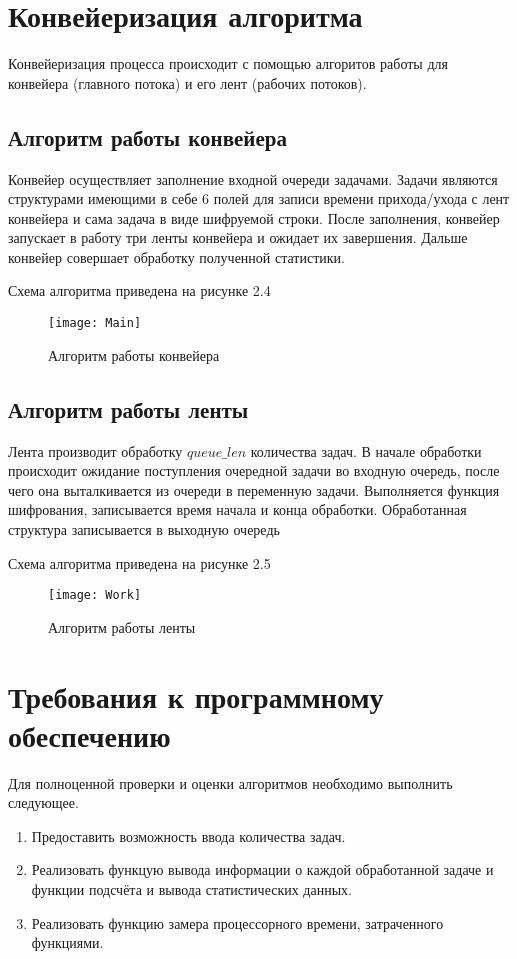 \section{Конвейеризация алгоритма}
Конвейеризация процесса происходит с помощью алгоритов работы для конвейера (главного потока) и его лент (рабочих потоков).

	\subsection{Алгоритм работы конвейера}
	Конвейер осуществляет заполнение входной очереди задачами. Задачи являются структурами имеющими в себе 6 полей для записи времени прихода/ухода с лент конвейера и сама задача в виде шифруемой строки. После заполнения, конвейер запускает в работу три ленты конвейера и ожидает их завершения. Дальше конвейер совершает обработку полученной статистики.
	
	Схема алгоритма приведена на рисунке 2.4
	\begin{figure}[h]
		\begin{center}
			{\texttt{[image: Main]}}
			\caption{Алгоритм работы конвейера}
		\end{center}
	\end{figure}

	\subsection{Алгоритм работы ленты}
	Лента производит обработку $queue\_len$ количества задач. В начале обработки происходит ожидание поступления очередной задачи во входную очередь, после чего она выталкивается из очереди в переменную задачи. Выполняется функция шифрования, записывается время начала и конца обработки. Обработанная структура записывается в выходную очередь
	
	Схема алгоритма приведена на рисунке 2.5
	\begin{figure}[h]
		\begin{center}
			{\texttt{[image: Work]}}
			\caption{Алгоритм работы ленты}
		\end{center}
	\end{figure}


\section{Требования к программному обеспечению}
Для полноценной проверки и оценки алгоритмов необходимо выполнить следующее.
\begin{enumerate}
	\item Предоставить возможность ввода количества задач.
	\item Реализовать функцую вывода информации о каждой обработанной задаче и функции подсчёта и вывода статистических данных.
	\item Реализовать функцию замера процессорного времени, затраченного функциями.
\end{enumerate}


